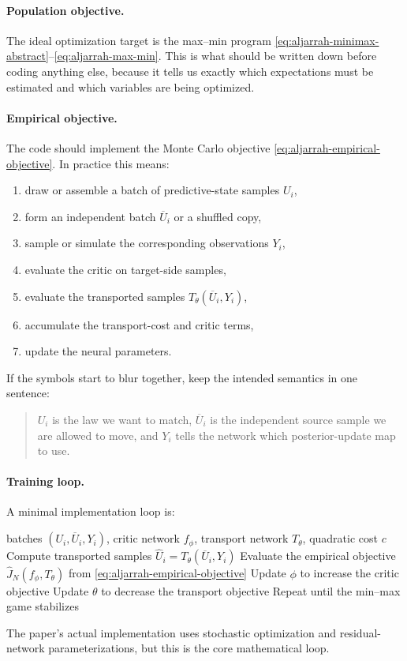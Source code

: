 \documentclass[11pt]{report}
\begin{document}
\paragraph{Population objective.}
The ideal optimization target is the max--min program
\eqref{eq:aljarrah-minimax-abstract}--\eqref{eq:aljarrah-max-min}.  This is what
should be written down before coding anything else, because it tells us exactly
which expectations must be estimated and which variables are being optimized.

\paragraph{Empirical objective.}
The code should implement the Monte Carlo objective
\eqref{eq:aljarrah-empirical-objective}.  In practice this means:
\begin{enumerate}[label=(\arabic*)]
  \item draw or assemble a batch of predictive-state samples $U_i$,
  \item form an independent batch $\overline U_i$ or a shuffled copy,
  \item sample or simulate the corresponding observations $Y_i$,
  \item evaluate the critic on target-side samples,
  \item evaluate the transported samples $T_\theta(\overline U_i,Y_i)$,
  \item accumulate the transport-cost and critic terms,
  \item update the neural parameters.
\end{enumerate}
If the symbols start to blur together, keep the intended semantics in one sentence:
\begin{quote}
$U_i$ is the law we want to match, $\overline U_i$ is the independent source sample
we are allowed to move, and $Y_i$ tells the network which posterior-update map to
use.
\end{quote}

\paragraph{Training loop.}
A minimal implementation loop is:
\begin{algorithm}[ht]
\caption{Conditional Brenier OT filter-map training loop}
\begin{algorithmic}[1]
\Require batches $(U_i,\overline U_i,Y_i)$, critic network $f_\phi$, transport network $T_\theta$, quadratic cost $c$
\State Compute transported samples $\widehat U_i=T_\theta(\overline U_i,Y_i)$
\State Evaluate the empirical objective $\widehat J_N(f_\phi,T_\theta)$ from \eqref{eq:aljarrah-empirical-objective}
\State Update $\phi$ to increase the critic objective
\State Update $\theta$ to decrease the transport objective
\State Repeat until the min--max game stabilizes
\end{algorithmic}
\end{algorithm}
The paper's actual implementation uses stochastic optimization and residual-network
parameterizations, but this is the core mathematical loop.
\end{document}
